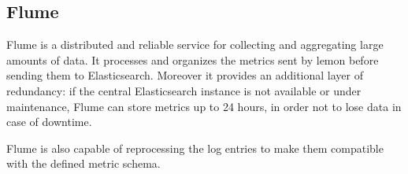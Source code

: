 \subsection{Flume}

Flume is a distributed and reliable service for collecting and aggregating
large amounts of data. It processes and organizes the metrics sent by
lemon before sending them to Elasticsearch. Moreover it provides an
additional layer of redundancy: if the central Elasticsearch instance is
not available or under maintenance, Flume can store metrics up to 24
hours, in order not to lose data in case of downtime.

Flume is also capable of reprocessing the log entries to make them
compatible with the defined metric schema.
